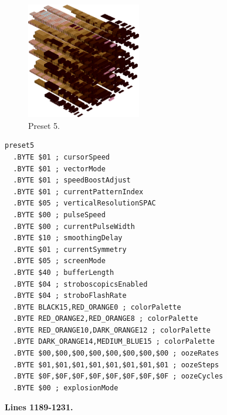\vspace*{0.5cm}
\begin{minipage}[b]{0.48\linewidth}
\begin{figure}[H]                                                          
  \centering                                                             
  \begin{adjustbox}{width=5cm,center}                                   
  \includegraphics[width=5cm]{src/colorspace_presets/preset5-45.png}%
  \end{adjustbox}                                                        
\caption*{Preset 5.}                                           
\end{figure}                                                               
\end{minipage}
\hspace{0.1cm}
\begin{minipage}[b]{0.48\linewidth}                                                                         
\begin{lstlisting}[basicstyle=\ttfamily\tiny]
preset5
  .BYTE $01 ; cursorSpeed
  .BYTE $01 ; vectorMode
  .BYTE $01 ; speedBoostAdjust
  .BYTE $01 ; currentPatternIndex
  .BYTE $05 ; verticalResolutionSPAC
  .BYTE $00 ; pulseSpeed
  .BYTE $00 ; currentPulseWidth
  .BYTE $10 ; smoothingDelay
  .BYTE $01 ; currentSymmetry
  .BYTE $05 ; screenMode
  .BYTE $40 ; bufferLength
  .BYTE $04 ; stroboscopicsEnabled
  .BYTE $04 ; stroboFlashRate
  .BYTE BLACK15,RED_ORANGE0 ; colorPalette
  .BYTE RED_ORANGE2,RED_ORANGE8 ; colorPalette
  .BYTE RED_ORANGE10,DARK_ORANGE12 ; colorPalette
  .BYTE DARK_ORANGE14,MEDIUM_BLUE15 ; colorPalette
  .BYTE $00,$00,$00,$00,$00,$00,$00,$00 ; oozeRates
  .BYTE $01,$01,$01,$01,$01,$01,$01,$01 ; oozeSteps
  .BYTE $0F,$0F,$0F,$0F,$0F,$0F,$0F,$0F ; oozeCycles
  .BYTE $00 ; explosionMode
\end{lstlisting}
\end{minipage}
\clearpage
\textbf{Lines 1189-1231. } 
